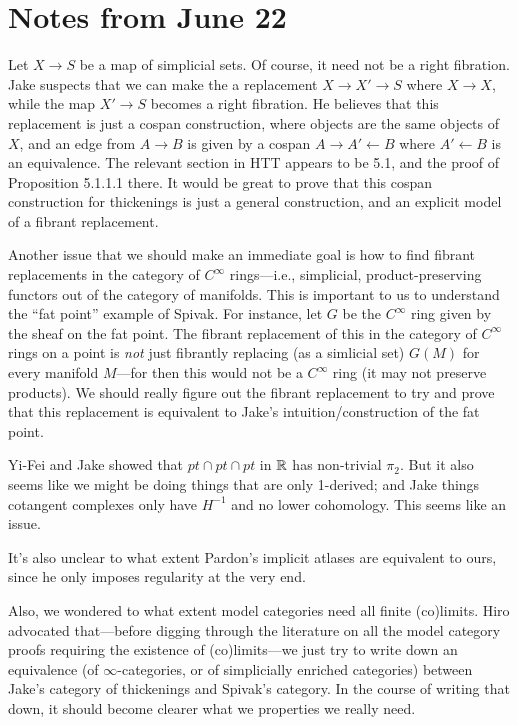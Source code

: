 

\section{Notes from June 22}

Let $X \to S$ be a map of simplicial sets. Of course, it need not be a right fibration. Jake suspects that we can make the a replacement $X \to X' \to S$ where $X \to X$, while the map $X' \to S$ becomes a right fibration. He believes that this replacement is just a cospan construction, where objects are the same objects of $X$, and an edge from $A \to B$ is given by a cospan $A \to A' \leftarrow B$ where $A' \leftarrow B$ is an equivalence. The relevant section in HTT appears to be 5.1, and the proof of Proposition 5.1.1.1 there. It would be great to prove that this cospan construction for thickenings is just a general construction, and an explicit model of a fibrant replacement.

Another issue that we should make an immediate goal is how to find fibrant replacements in the category of $C^\infty$ rings---i.e., simplicial, product-preserving functors out of the category of manifolds. This is important to us to understand the ``fat point'' example of Spivak. For instance, let $G$ be the $C^\infty$ ring given by the sheaf on the fat point. The fibrant replacement of this in the category of $C^\infty$ rings on a point is {\em not} just fibrantly replacing (as a simlicial set) $G(M)$ for every manifold $M$---for then this would not be a $C^\infty$ ring (it may not preserve products). We should really figure out the fibrant replacement to try and prove that this replacement is equivalent to Jake's intuition/construction of the fat point.

Yi-Fei and Jake showed that $pt \cap pt \cap pt$ in $\mathbb R$ has non-trivial $\pi_2$. But it also seems like we might be doing things that are only 1-derived; and Jake things cotangent complexes only have $H^{-1}$ and no lower cohomology. This seems like an issue. 

It's also unclear to what extent Pardon's implicit atlases are equivalent to ours, since he only imposes regularity at the very end.

Also, we wondered to what extent model categories need all finite (co)limits. Hiro advocated that---before digging through the literature on all the model category proofs requiring the existence of (co)limits---we just try to write down an equivalence (of $\infty$-categories, or of simplicially enriched categories) between Jake's category of thickenings and Spivak's category. In the course of writing that down, it should become clearer what we properties we really need.


